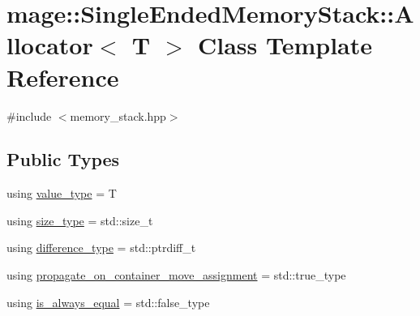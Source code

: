 \hypertarget{classmage_1_1_single_ended_memory_stack_1_1_allocator}{}\section{mage\+:\+:Single\+Ended\+Memory\+Stack\+:\+:Allocator$<$ T $>$ Class Template Reference}
\label{classmage_1_1_single_ended_memory_stack_1_1_allocator}


{\ttfamily \#include $<$memory\+\_\+stack.\+hpp$>$}

\subsection*{Public Types}
\begin{DoxyCompactItemize}
\item 
using \mbox{\hyperlink{classmage_1_1_single_ended_memory_stack_1_1_allocator_a1dafabb56c4b51ad6bfc19769f48c8be}{value\+\_\+type}} = T
\item 
using \mbox{\hyperlink{classmage_1_1_single_ended_memory_stack_1_1_allocator_a4433de74b466aa720a40f4d29469e0f9}{size\+\_\+type}} = std\+::size\+\_\+t
\item 
using \mbox{\hyperlink{classmage_1_1_single_ended_memory_stack_1_1_allocator_aa7f0c1c97c303ab2ba3e8d74256490a8}{difference\+\_\+type}} = std\+::ptrdiff\+\_\+t
\item 
using \mbox{\hyperlink{classmage_1_1_single_ended_memory_stack_1_1_allocator_a299eaeb1bc7cdc17f58deefb8e334f34}{propagate\+\_\+on\+\_\+container\+\_\+move\+\_\+assignment}} = std\+::true\+\_\+type
\item 
using \mbox{\hyperlink{classmage_1_1_single_ended_memory_stack_1_1_allocator_aa62e1b505ea8f83a4f3014b0242e124f}{is\+\_\+always\+\_\+equal}} = std\+::false\+\_\+type
\end{DoxyCompactItemize}

